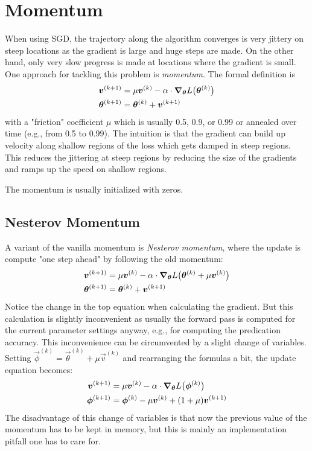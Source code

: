 	\section{Momentum}
		When using SGD, the trajectory along the algorithm converges is very jittery on steep locations as the gradient is large and huge steps are made. On the other hand, only very slow progress is made at locations where the gradient is small. One approach for tackling this problem is \emph{momentum}. The formal definition is
		\begin{align}
			\bm{v}^{(k + 1)} &= \mu \bm{v}^{(k)} - \alpha \cdot \grad_{\bm{\theta}} L\bigl(\bm{\theta}^{(k)}\bigr) \\
			\bm{\theta}^{(k + 1)} &= \bm{\theta}^{(k)} + \bm{v}^{(k + 1)}
		\end{align}
		with a "friction" coefficient \(\mu\) which is usually \num{0.5}, \num{0.9}, or \num{0.99} or annealed over time (e.g., from \num{0.5} to \num{0.99}). The intuition is that the gradient can build up velocity along shallow regions of the loss which gets damped in steep regions. This reduces the jittering at steep regions by reducing the size of the gradients and ramps up the speed on shallow regions.

		The momentum is usually initialized with zeros.

		\subsection{Nesterov Momentum}
			A variant of the vanilla momentum is \emph{Nesterov momentum}, where the update is compute "one step ahead" by following the old momentum:
			\begin{align}
				\bm{v}^{(k + 1)} &= \mu \bm{v}^{(k)} - \alpha \cdot \grad_{\bm{\theta}} L\bigl( \bm{\theta}^{(k)} + \mu \bm{v}^{(k)} \bigr) \\
				\bm{\theta}^{(k + 1)} &= \bm{\theta}^{(k)} + \bm{v}^{(k + 1)}
			\end{align}
			Notice the change in the top equation when calculating the gradient. But this calculation is slightly inconvenient as usually the forward pass is computed for the current parameter settings anyway, e.g., for computing the predication accuracy. This inconvenience can be circumvented by a slight change of variables. Setting \( \vec{\phi}^{(k)} = \vec{\theta}^{(k)} + \mu \vec{v}^{(k)} \) and rearranging the formulas a bit, the update equation becomes:
			\begin{align}
				\bm{v}^{(k + 1)} &= \mu \bm{v}^{(k)} - \alpha \cdot \grad_{\bm{\theta}} L\bigl(\bm{\phi}^{(k)}\bigr) \\
				\bm{\phi}^{(k + 1)} &= \bm{\phi}^{(k)} - \mu \bm{v}^{(k)} + (1 + \mu) \bm{v}^{(k + 1)}
			\end{align}
			The disadvantage of this change of variables is that now the previous value of the momentum has to be kept in memory, but this is mainly an implementation pitfall one has to care for.

